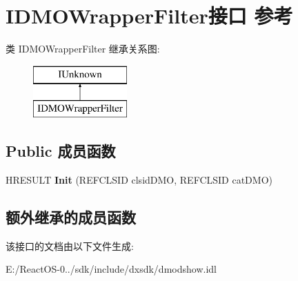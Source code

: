 \hypertarget{interface_i_d_m_o_wrapper_filter}{}\section{I\+D\+M\+O\+Wrapper\+Filter接口 参考}
\label{interface_i_d_m_o_wrapper_filter}
类 I\+D\+M\+O\+Wrapper\+Filter 继承关系图\+:\begin{figure}[H]
\begin{center}
\leavevmode
\includegraphics[height=2.000000cm]{interface_i_d_m_o_wrapper_filter}
\end{center}
\end{figure}
\subsection*{Public 成员函数}
\begin{DoxyCompactItemize}
\item 
\mbox{\label{interface_i_d_m_o_wrapper_filter_a0f99a30dd1de169cc72cdc5ea2943726}} 
H\+R\+E\+S\+U\+LT {\bfseries Init} (R\+E\+F\+C\+L\+S\+ID clsid\+D\+MO, R\+E\+F\+C\+L\+S\+ID cat\+D\+MO)
\end{DoxyCompactItemize}
\subsection*{额外继承的成员函数}


该接口的文档由以下文件生成\+:\begin{DoxyCompactItemize}
\item 
E\+:/\+React\+O\+S-\/0../sdk/include/dxsdk/dmodshow.\+idl\end{DoxyCompactItemize}
